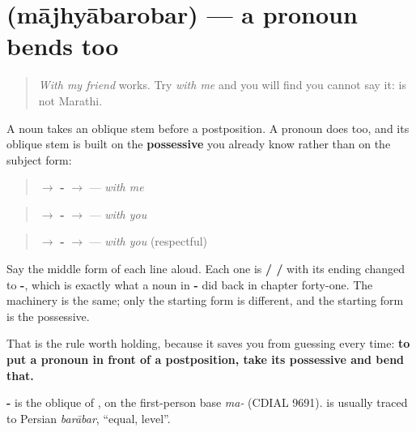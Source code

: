 \section[\texorpdfstring{\mr{माझ्याबरोबर} (mājhyābarobar)}{माझ्याबरोबर (mājhyābarobar)}]{ (mājhyābarobar) — a pronoun bends too}

\label{lesson:MR-C45-pron-oblique}



\begin{quote}
\emph{With my friend} works. Try \emph{with me} and you will find you cannot say it: \textbf{ } is not Marathi.
\end{quote}

\begin{grammarlens}[title={Grammar Lens: the pronoun goes through its possessive first}]
A noun takes an oblique stem before a postposition. A pronoun does too, and its oblique stem is built on the \textbf{possessive} you already know rather than on the subject form:

\begin{quote}
\textbf{} $\to$ \textbf{-} $\to$ \textbf{} — \emph{with me}
\end{quote}

\begin{quote}
\textbf{} $\to$ \textbf{-} $\to$ \textbf{} — \emph{with you}
\end{quote}

\begin{quote}
\textbf{} $\to$ \textbf{-} $\to$ \textbf{} — \emph{with you} (respectful)
\end{quote}

Say the middle form of each line aloud. Each one is \textbf{ /  / } with its ending changed to \textbf{-}, which is exactly what a noun in \textbf{-} did back in chapter forty-one. The machinery is the same; only the starting form is different, and the starting form is the possessive.

That is the rule worth holding, because it saves you from guessing every time: \textbf{to put a pronoun in front of a postposition, take its possessive and bend that.}
\end{grammarlens}

\begin{cousinweb}
\textbf{-} is the oblique of \textbf{}, on the first-person base \emph{ma-} (CDIAL 9691). \textbf{} is usually traced to Persian \emph{barābar}, \textquotedblleft{}equal, level\textquotedblright{}.
\end{cousinweb}

